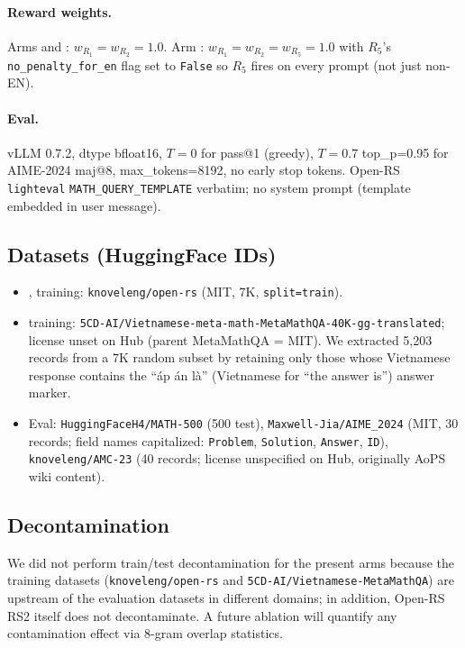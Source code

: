 \paragraph{Reward weights.} Arms \armA{} and \armB{}: $w_{R_1}{=}w_{R_2}{=}1.0$.
Arm \armC{}: $w_{R_1}{=}w_{R_2}{=}w_{R_5}{=}1.0$ with
$R_5$'s \texttt{no\_penalty\_for\_en} flag set to \texttt{False} so $R_5$ fires on
every prompt (not just non-EN).

\paragraph{Eval.} vLLM 0.7.2, dtype bfloat16, $T{=}0$ for pass@1 (greedy), $T{=}0.7$
top\_p=0.95 for AIME-2024 maj@8, max\_tokens=8192, no early stop tokens.
Open-RS \texttt{lighteval} \texttt{MATH\_QUERY\_TEMPLATE} verbatim; no system
prompt (template embedded in user message).

\subsection{Datasets (HuggingFace IDs)}
\begin{itemize}\itemsep0pt
\item \armA{}, \armC{} training: \texttt{knoveleng/open-rs} (MIT, 7K, \texttt{split=train}).
\item \armB{} training:
\texttt{5CD-AI/Vietnamese-meta-math-MetaMathQA-40K-gg-translated}; license unset
on Hub (parent MetaMathQA = MIT). We extracted 5{,}203 records from a 7K random
subset by retaining only those whose Vietnamese response contains the
``\DJ\'ap \'an l\`a'' (Vietnamese for ``the answer is'') answer marker.
\item Eval: \texttt{HuggingFaceH4/MATH-500} (500 test), \texttt{Maxwell-Jia/AIME\_2024}
(MIT, 30 records; field names capitalized: \texttt{Problem}, \texttt{Solution},
\texttt{Answer}, \texttt{ID}), \texttt{knoveleng/AMC-23} (40 records; license
unspecified on Hub, originally AoPS wiki content).
\end{itemize}

\subsection{Decontamination}
We did not perform train/test decontamination for the present arms because the
training datasets (\texttt{knoveleng/open-rs} and \texttt{5CD-AI/Vietnamese-MetaMathQA})
are upstream of the evaluation datasets in different domains; in addition,
Open-RS RS2 itself does not decontaminate. A future ablation will quantify any
contamination effect via 8-gram overlap statistics.


